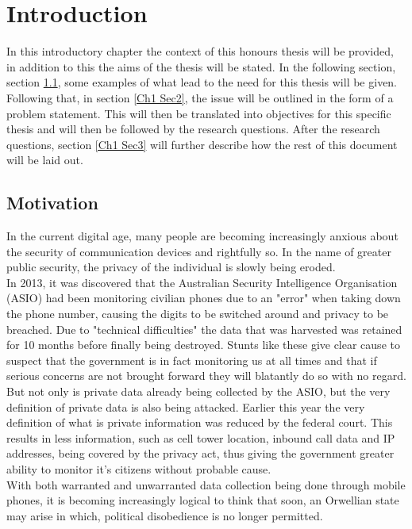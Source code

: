 
\chapter{Introduction} %

\label{Chapter 1} %

In this introductory chapter the context of this honours thesis will be provided, in addition to this the aims of the thesis will be stated. In the following section, section \ref{Ch1 Sec1}, some examples of what lead to the need for this thesis will be given. Following that, in section \ref{Ch1 Sec2}, the issue will be outlined in the form of a problem statement. This will then be translated into objectives for this specific thesis and will then be followed by the research questions. After the research questions, section \ref{Ch1 Sec3} will further describe how the rest of this document will be laid out.   


\section{Motivation}

\label{Ch1 Sec1}

In the current digital age, many people are becoming increasingly anxious about the security of communication devices and rightfully so. In the name of greater public security, the privacy of the individual is slowly being eroded.\\
In 2013, it was discovered that the Australian Security Intelligence Organisation (ASIO) had been monitoring civilian phones due to an "error" when taking down the phone number, causing the digits to be switched around and privacy to be breached. Due to "technical difficulties" the data that was harvested was retained for 10 months before finally being destroyed.\cite{Reference36} Stunts like these give clear cause to suspect that the government is in fact monitoring us at all times and that if serious concerns are not brought forward they will blatantly do so with no regard.\\
But not only is private data already being collected by the ASIO, but the very definition of private data is also being attacked. Earlier this year the very definition of what is private information was reduced by the federal court. This results in less information, such as cell tower location, inbound call data and IP addresses, being covered by the privacy act, thus giving the government greater ability to monitor it's citizens without probable cause.\cite{Reference37}\\
With both warranted and unwarranted data collection being done through mobile phones, it is becoming increasingly logical to think that soon, an Orwellian state may arise in which, political disobedience is no longer permitted.


